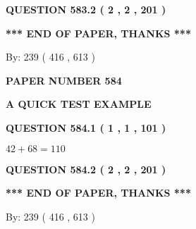 \documentclass[12pt]{article}
\begin{document}
 
  
\vspace{0.2in}
  
{\textbf{\Large{QUESTION
583.2 
 ( 2 , 2 , 201 )
}}}
  
  
   
   
 \vspace{0.2in}
 
   
   
   
   
\vspace{1.0in} 
{\textbf{\large{ *** END OF PAPER, THANKS *** }}} 
   
   
\hspace{1.0in} By: 
 239 ( 416 ,  613 )
   
   
   
   
\newpage 
\setcounter{page}{ 
   584001 } 
   
   
   
   
 {\textbf{ \Large{ PAPER NUMBER  584  }}}
   
   
\vspace{0.2in}
   
   
   
   
   
   
 \vspace{0.2in}
{\LARGE {\textbf{ A QUICK TEST EXAMPLE}}}
   
   
  
\vspace{0.2in}
  
{\textbf{\Large{QUESTION
584.1 
 ( 1 , 1 , 101 )
}}}
  
  
 
 

$ %
42 +  %
68=   %
110$
 
 
  
\vspace{0.2in}
  
{\textbf{\Large{QUESTION
584.2 
 ( 2 , 2 , 201 )
}}}
  
  
   
   
 \vspace{0.2in}
 
   
   
   
   
\vspace{1.0in} 
{\textbf{\large{ *** END OF PAPER, THANKS *** }}} 
   
   
\hspace{1.0in} By: 
 239 ( 416 ,  613 )
   
\end{document}
